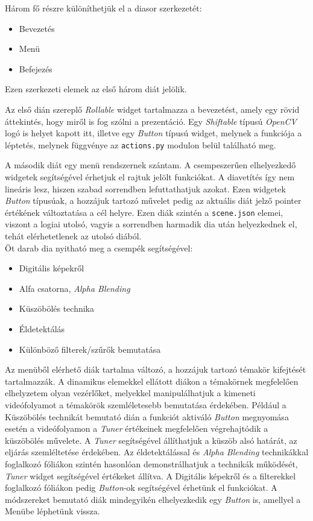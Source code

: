 Három fő részre különíthetjük el a diasor szerkezetét:
\begin{itemize}
	\item Bevezetés
	\item Menü
	\item Befejezés
\end{itemize}
Ezen szerkezeti elemek az első három diát jelölik.

Az első dián szereplő \textit{Rollable} widget tartalmazza a bevezetést, amely egy rövid áttekintés, hogy miről is fog szólni a prezentáció. Egy \textit{Shiftable} típusú \textit{OpenCV} logó is helyet kapott itt, illetve egy \textit{Button} típusú widget, melynek a funkciója a léptetés, melynek függvénye az \texttt{actions.py} modulon belül található meg.

A második diát egy menü rendszernek szántam. A csempeszerűen elhelyezkedő widgetek segítségével érhetjuk el rajtuk jelölt funkciókat. A diavetítés így nem lineáris lesz, hiszen szabad sorrendben lefuttathatjuk azokat. Ezen widgetek \textit{Button} típusúak, a hozzájuk tartozó művelet pedig az aktuális diát jelző pointer értékének változtatása a cél helyre. Ezen diák szintén a \texttt{scene.json} elemei, viszont a logiai utolsó, vagyis a sorrendben harmadik dia után helyezkednek el, tehát elérhetetlenek az utolsó diából.\\
Öt darab dia nyitható meg a csempék segítségével:
\begin{itemize}
	\item Digitális képekről
	\item Alfa csatorna, \textit{Alpha Blending}
	\item Küszöbölés technika
	\item Éldetektálás
	\item Különböző filterek/szűrők bemutatása
\end{itemize}
Az menüből elérhető diák tartalma változó, a hozzájuk tartozó témakör kifejtését tartalmazzák. A dinamikus elemekkel ellátott diákon a témakörnek megfelelően elhelyzetem olyan vezérlőket, melyekkel manipulálhatjuk a kimeneti videófolyamot a témakörök szemléletesebb bemutatása érdekében.
Például a Küszöbölés technikát bemutató dián a funkciót aktiváló \textit{Button} megnyomása esetén a videófolyamon a \textit{Tuner} értékeinek megfelelően végrehajtódik a küszöbölés művelete. A \textit{Tuner} segítségével állíthatjuk a küszöb alsó határát, az eljárás szemléltetése érdekében.
Az éldetektálással és \textit{Alpha Blending} technikákkal foglalkozó fóliákon szintén hasonlóan demonstrálhatjuk a technikák működését, \textit{Tuner} widget segítségével értékeket állítva.
A Digitális képekről és a filterekkel foglalkozó fóliákon pedig \textit{Button}-ok segítségével érhetünk el funkciókat.
A módszereket bemutató diák mindegyikén elhelyezkedik egy \textit{Button} is, amellyel a Menübe léphetünk vissza.


